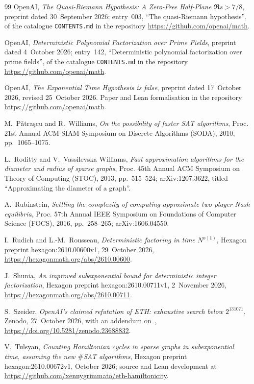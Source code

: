 \documentclass[10pt]{amsart}
\theoremstyle{plain}
\theoremstyle{definition}
\theoremstyle{remark}
\numberwithin{equation}{section}
\begin{document}
\begin{thebibliography}{99}
OpenAI, \emph{The {Q}uasi-{R}iemann {H}ypothesis: {A} {Z}ero-{F}ree {H}alf-{P}lane $\Re s>7/8$}, preprint
dated 30~September 2026; entry~003, ``The quasi-Riemann hypothesis'', of the catalogue \texttt{CONTENTS.md}
in the repository \url{https://github.com/openai/math}.

OpenAI, \emph{Deterministic {P}olynomial {F}actorization over {P}rime {F}ields}, preprint dated 4~October
2026; entry~142, ``Deterministic polynomial factorization over prime fields'', of the catalogue
\texttt{CONTENTS.md} in the repository \url{https://github.com/openai/math}.

OpenAI, \emph{The {E}xponential {T}ime {H}ypothesis is false}, preprint dated 17~October 2026,
revised 25~October 2026. Paper and Lean formalisation in the repository
\url{https://github.com/openai/math}.

M.~P{\v{a}}tra{\c{s}}cu and R.~Williams, \emph{On the possibility of faster {SAT} algorithms}, Proc.
21st Annual ACM-SIAM Symposium on Discrete Algorithms (SODA), 2010, pp.~1065--1075.

L.~Roditty and V.~Vassilevska Williams, \emph{Fast approximation algorithms for the diameter and
radius of sparse graphs}, Proc. 45th Annual ACM Symposium on Theory of Computing (STOC), 2013,
pp.~515--524; arXiv:1207.3622, titled ``Approximating the diameter of a graph''.

A.~Rubinstein, \emph{Settling the complexity of computing approximate two-player {N}ash
equilibria}, Proc. 57th Annual IEEE Symposium on Foundations of Computer Science (FOCS), 2016,
pp.~258--265; arXiv:1606.04550.

I.~Rudich and L.-M.~Rousseau, \emph{Deterministic factoring in time $N^{o(1)}$}, Hexagon preprint
hexagon:2610.00600v1, 29~October 2026, \url{https://hexagonmath.org/abs/2610.00600}.

J.~Shunia, \emph{An improved subexponential bound for deterministic integer factorization}, Hexagon
preprint hexagon:2610.00711v1, 2~November 2026, \url{https://hexagonmath.org/abs/2610.00711}.

S.~Szeider, \emph{{OpenAI}'s claimed refutation of {ETH}: exhaustive search below $2^{131071}$}, Zenodo,
27~October 2026, with an addendum on~\cite{Anthropic26}, \url{https://doi.org/10.5281/zenodo.23688832}.

V.~Tulsyan, \emph{Counting {H}amiltonian cycles in sparse graphs in subexponential time, assuming
the new $\#${SAT} algorithms}, Hexagon preprint hexagon:2610.00672v1, October 2026; source and Lean
development at \url{https://github.com/xennygrimmato/eth-hamiltonicity}.


\end{thebibliography}
\end{document}
